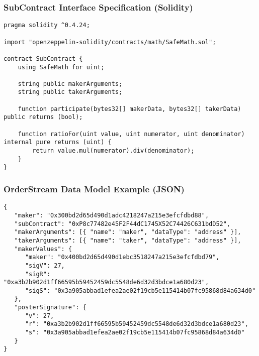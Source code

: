 \documentclass[9pt]{article}
\begin{document}
\subsubsection{SubContract Interface Specification (Solidity)}\label{subcontract code}
\begin{lstlisting}[language=Solidity]
pragma solidity ^0.4.24;

import "openzeppelin-solidity/contracts/math/SafeMath.sol";

contract SubContract {
    using SafeMath for uint;

    string public makerArguments;
    string public takerArguments;

    function participate(bytes32[] makerData, bytes32[] takerData) public returns (bool);

    function ratioFor(uint value, uint numerator, uint denominator) internal pure returns (uint) {
        return value.mul(numerator).div(denominator);
    }
}
\end{lstlisting}

\subsubsection{OrderStream Data Model Example (JSON)}
\begin{lstlisting}
{
   "maker": "0x300bd2d65d490d1adc4218247a215e3efcfdbd88",
   "subContract": "0xP8c77482e45F2F44dC1745X52C74426C631bdD52",
   "makerArguments": [{ "name": "maker", "dataType": "address" }],
   "takerArguments": [{ "name": "taker", "dataType": "address" }],
   "makerValues": {
      "maker": "0x400bd2d65d490d1ebc3518247a215e3efcfdbd79",
      "sigV": 27,
      "sigR": "0xa3b2b902d1ff66595b59452459dc5548de6d32d3bdce1a680d23",
      "sigS": "0x3a905abbad1efea2ae02f19cb5e115414b07fc95868d84a634d0"
   },
   "posterSignature": {
      "v": 27,
      "r": "0xa3b2b902d1ff66595b59452459dc5548de6d32d3bdce1a680d23",
      "s": "0x3a905abbad1efea2ae02f19cb5e115414b07fc95868d84a634d0"
   }
}
\end{lstlisting} 

\clearpage
\pagebreak
\end{document}
